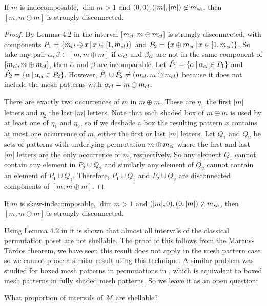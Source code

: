 \documentclass[11pt,a4paper,oneside]{article}
\begin{document}
\begin{lem}
If $m$ is indecomposable, $\dim m > 1$ and $(0,0),(|m|,|m|)\not\in m_{sh}$, then
$[m,m\oplus m]$ is strongly disconnected.
\begin{proof}
By Lemma 4.2 in \cite{McSt13} the interval $[m_{cl},m\oplus m_{cl}]$ is strongly disconnected,
with components $P_1=\{m_{cl}\oplus x\,|\,x\in [1,m_{cl})\}$ and 
$P_2=\{x\oplus m_{cl}\,|\,x\in [1,m_{cl})\}$. So take any pair $\alpha,\beta\in[m,m\oplus m]$
if $\alpha_{cl}$ and $\beta_{cl}$ are not in the same component of  $[m_{cl},m\oplus m_{cl}]$,
then $\alpha$ and $\beta$ are incomparable. Let $\hat{P_1}=\{\alpha\,|\,\alpha_{cl}\in P_1\}$
and $\hat{P_2}=\{\alpha\,|\,\alpha_{cl}\in P_2\}$. However, $\hat{P_1}\cup\hat{P_2}\not=(m_{cl},m\oplus m_{cl})$
because it does not include the mesh patterns with $\alpha_{cl}=m\oplus m_{cl}$.

There are exactly two occurrences of $m$ in $m\oplus m$. These are $\eta_1$ the first $|m|$ letters
and $\eta_2$ the last $|m|$ letters. Note that each shaded box of $m\oplus m$ is used by at least one 
of $\eta_1$ and $\eta_2$, so if we deshade a box the resulting pattern $x$ contains at most one occurrence of $m$,
either the first or last $|m|$ letters. Let $Q_1$ and $Q_2$ be sets of patterns with underlying permutation
$m\oplus m_{cl}$ where the first and last $|m|$ letters are the only occurrence of $m$, respectively. So any
element $Q_1$ cannot contain any element in $P_2\cup Q_2$ and similarly any element of $Q_2$ cannot
contain an element of $P_1\cup Q_1$. Therefore, $P_1\cup Q_1$ and $P_2\cup Q_2$ are disconnected components of 
$[m,m\oplus m]$.
\end{proof}
\end{lem}
\begin{cor}
If $m$ is skew-indecomposable, $\dim m>1$ and $(|m|,0),(0,|m|)\not\in m_{sh}$, then
$[m,m\ominus m]$ is strongly disconnected.
\end{cor}

Using Lemma 4.2 in \cite{McSt13} it is shown that
almost all intervals of the classical permutation poset are not shellable. The
proof of this follows from the Marcus-Tardos theorem, we have seen this result
does not apply in the mesh pattern case so we cannot prove a similar result
using this technique.  A similar problem was studied for boxed mesh patterns in
permutations in \cite{AKV13}, which is equivalent to boxed mesh patterns in
fully shaded mesh patterns. So we leave it as an open question:

\begin{que}
What proportion of intervals of $\mathcal{M}$ are shellable?
\end{que}
\end{document}
